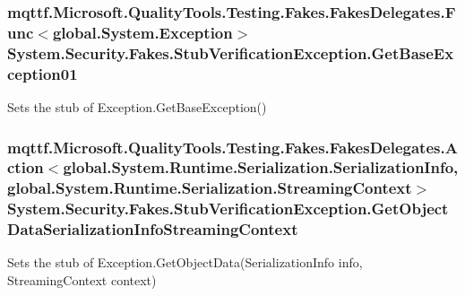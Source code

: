 \hypertarget{class_system_1_1_security_1_1_fakes_1_1_stub_verification_exception_a5702e6e0d4c462061f7a2f3928eff4fd}{
\subsubsection[{Get\-Base\-Exception01}]{\setlength{\rightskip}{0pt plus 5cm}mqttf.\-Microsoft.\-Quality\-Tools.\-Testing.\-Fakes.\-Fakes\-Delegates.\-Func$<$global.\-System.\-Exception$>$ System.\-Security.\-Fakes.\-Stub\-Verification\-Exception.\-Get\-Base\-Exception01}}\label{class_system_1_1_security_1_1_fakes_1_1_stub_verification_exception_a5702e6e0d4c462061f7a2f3928eff4fd}


Sets the stub of Exception.\-Get\-Base\-Exception()

\hypertarget{class_system_1_1_security_1_1_fakes_1_1_stub_verification_exception_a57749fe3f1ef15000f61601169517b70}{
\subsubsection[{Get\-Object\-Data\-Serialization\-Info\-Streaming\-Context}]{\setlength{\rightskip}{0pt plus 5cm}mqttf.\-Microsoft.\-Quality\-Tools.\-Testing.\-Fakes.\-Fakes\-Delegates.\-Action$<$global.\-System.\-Runtime.\-Serialization.\-Serialization\-Info, global.\-System.\-Runtime.\-Serialization.\-Streaming\-Context$>$ System.\-Security.\-Fakes.\-Stub\-Verification\-Exception.\-Get\-Object\-Data\-Serialization\-Info\-Streaming\-Context}}\label{class_system_1_1_security_1_1_fakes_1_1_stub_verification_exception_a57749fe3f1ef15000f61601169517b70}


Sets the stub of Exception.\-Get\-Object\-Data(\-Serialization\-Info info, Streaming\-Context context)

